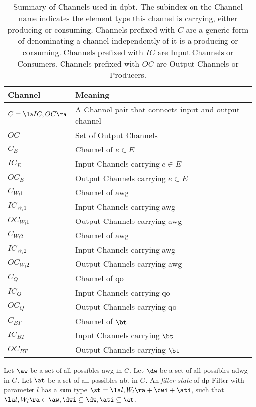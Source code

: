 \begin{table}[ht!]
\centering
\begin{tabular}{|p{0.2\linewidth}|p{0.8\linewidth}|} \hline
\textbf{Channel} & \textbf{Meaning}\\ \hline
$C = \la IC, OC \ra$ & A Channel pair that connects input and output channel\\ \hline
$OC$ & Set of Output Channels \\ \hline
$C_E$ & Channel of $e \in E$ \\ \hline
$IC_E$ & Input Channels carrying $e \in E$ \\ \hline
$OC_E$ & Output Channels carrying $e \in E$ \\ \hline
$C_{W_l1}$ & Channel of \acrshort{awg} \\ \hline
$IC_{W_l1}$ & Input Channels carrying \acrshort{awg} \\ \hline
$OC_{W_l1}$ & Output Channels carrying \acrshort{awg} \\ \hline
$C_{W_l2}$ & Channel of \acrshort{awg} \\ \hline
$IC_{W_l2}$ & Input Channels carrying \acrshort{awg} \\ \hline
$OC_{W_l2}$ & Output Channels carrying \acrshort{awg} \\ \hline
$C_Q$ & Channel of \acrshort{qo} \\ \hline
$IC_Q$ & Input Channels carrying \acrshort{qo} \\ \hline
$OC_Q$ & Output Channels carrying \acrshort{qo} \\ \hline
$C_{BT}$ & Channel of $\bt$ \\ \hline
$IC_{BT}$ & Input Channels carrying $\bt$ \\ \hline
$OC_{BT}$ & Output Channels carrying $\bt$ \\ \hline
\end{tabular}
\caption[{[\acrshort{iebt}] Summary of Channels used in \acrshort{dpbt}}]{Summary of Channels used in \acrshort{dpbt}. The subindex on the Channel name indicates the element type this channel is carrying, either producing or consuming. Channels prefixed with $C$ are a generic form of denominating a channel independently of it is a producing or consuming. Channels prefixed with $IC$ are Input Channels or Consumers. Channels prefixed with $OC$ are Output Channels or Producers.}
\label{table:channels}
\end{table}

\begin{definition}
Let $\aw$ be a set of all possibles \acrlong{awg} in $G$.
Let $\dw$ be a set of all possibles \acrlong{adwg} in $G$.
Let $\at$ be a set of all possibles \acrlong{abt} in $G$.
An \textit{filter state} of \acrshort{dp} Filter with parameter $l$ has a sum type $\st = \la l, W_l \ra + \dwi + \ati$, such that $\la l, W_l \ra \in \aw, \dwi \subseteq \dw, \ati \subseteq \at$.
\end{definition}
 
